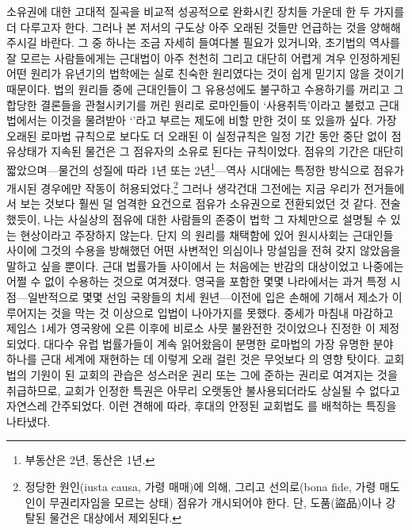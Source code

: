 소유권에 대한 고대적 질곡을 비교적 성공적으로 완화시킨 장치들 가운데
한 두 가지를 더 다루고자 한다.
그러나 본 저서의 구도상 아주 오래된 것들만 언급하는 것을
양해해 주시길 바란다.
그 중 하나는 조금 자세히 들여다볼 필요가 있거니와,
초기법의 역사를 잘 모르는 사람들에게는
근대법이 아주 천천히 그리고 대단히 어렵게 겨우 인정하게된
어떤 원리가 유년기의 법학에는 실로 친숙한 원리였다는 것이
쉽게 믿기지 않을 것이기 때문이다.
법의 원리들 중에
근대인들이 그 유용성에도 불구하고
수용하기를 꺼리고 그 합당한 결론들을 관철시키기를 꺼린
원리로
%
로마인들이 `\hypertarget{usucapio}{사용취득}'이라고
불렀고
근대법에서는
이것을 물려받아
`'라고 부르는 제도에
비할 만한 것이 또 있을까 싶다.
가장 오래된 로마법 규칙으로
보다도 더 오래된
이 실정규칙은
일정 기간 동안 중단 없이 점유상태가 지속된 물건은
그 점유자의 소유로 된다는 규칙이었다.
점유의 기간은 대단히 짧았으며---물건의 성질에 따라
1년 또는 2년\footnote{%
  부동산은 2년, 동산은 1년.
}---역사
시대에는 특정한 방식으로 점유가 개시된 경우에만 작동이 허용되었다.\footnote{%
  정당한 원인(iusta causa, 가령 매매)에 의해, 그리고
  선의로(bona fide, 가령 매도인이 무권리자임을 모르는 상태)
  점유가 개시되어야 한다.
  단, 도품(盜品)이나 강탈된 물건은 대상에서 제외된다. }
그러나 생각건대 그전에는
지금 우리가 전거들에서 보는 것보다 훨씬 덜 엄격한 요건으로
점유가 소유권으로 전환되었던 것 같다.
전술했듯이,
나는 사실상의 점유에 대한 사람들의 존중이
법학 그 자체만으로 설명될 수 있는 현상이라고 주장하지 않는다.
단지 의 원리를 채택함에 있어 원시사회는
근대인들 사이에 그것의 수용을 방해했던
어떤 사변적인 의심이나 망설임을 전혀 갖지 않았음을 말하고 싶을 뿐이다.
근대 법률가들 사이에서 는
처음에는 반감의 대상이었고
나중에는 어쩔 수 없이 수용하는 것으로 여겨졌다.
영국을 포함한 몇몇 나라에서는
과거 특정 시점---일반적으로 몇몇 선임 국왕들의 치세 원년---이전에 입은
손해에 기해서 제소가
이루어지는 것을 막는 것 이상으로
입법이 나아가지를 못했다.
중세가 마침내 마감하고
제임스 1세가 영국왕에 오른 이후에
비로소
사뭇 불완전한 것이었으나 진정한
이
제정되었다.
대다수 유럽 법률가들이 계속 읽어왔음이 분명한
로마법의 가장 유명한 분야 하나를 근대 세계에 재현하는 데
이렇게 오래 걸린 것은
무엇보다 의 영향 탓이다.
교회법의 기원이 된 교회의 관습은
성스러운 권리 또는 그에 준하는 권리로 여겨지는 것을 취급하므로,
교회가 인정한 특권은
아무리 오랫동안 불사용되더라도
상실될 수 없다고
자연스레
간주되었다.
이런 견해에 따라,
후대의 안정된 교회법도 를 배척하는 특징을 나타냈다.
